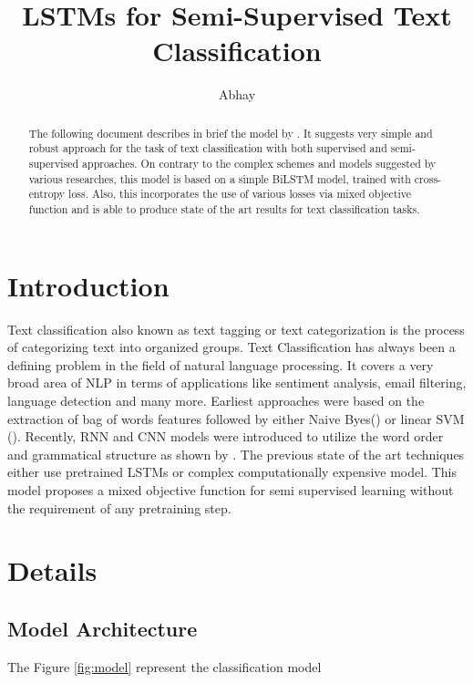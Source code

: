 \documentclass[12pt]{article}
\begin{document}
\title{LSTMs for Semi-Supervised Text Classification}
\author{Abhay}
\date{}
\maketitle
\singlespacing

\begin{abstract}
    The following document describes in brief the model by \cite{sachan2019revisiting}. It suggests very simple and robust approach for the task of text classification with both supervised and semi-supervised approaches. On contrary to the complex schemes and models suggested by various researches, this model is based on a simple BiLSTM model, trained with cross-entropy loss. Also, this incorporates the use of various losses via mixed objective function and is able to  produce state of the art results for text classification tasks.
\end{abstract}
\section{Introduction}
    Text classification also known as text tagging or text categorization is the process of categorizing text into organized groups. Text Classification has always been a defining problem in the field of natural language processing. It covers a very broad area of NLP in terms of  applications like sentiment analysis, email filtering, language detection and many more.
    Earliest approaches were based on the extraction of bag of words features followed by either Naive Byes(\cite{mccallum1998comparison}) or linear SVM (\cite{joachims1998text}). Recently, RNN and CNN models were introduced to utilize the word order and grammatical structure as shown by \cite{kim2014convolutional}. The previous state of the art techniques either use pretrained LSTMs or complex computationally expensive model.
    This model proposes a mixed objective function for semi supervised learning without the requirement of any pretraining step.
\section{Details}
\subsection{Model Architecture}
The Figure \ref{fig:model} represent the classification model
\end{document}
